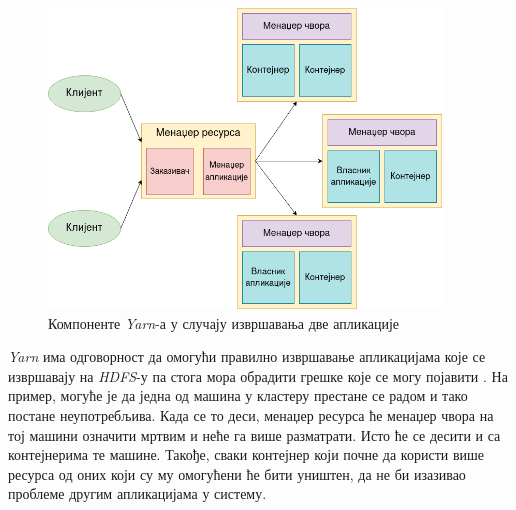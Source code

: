 \documentclass[12pt,oneside]{memoir}
\begin{document}
\begin{figure}[!ht]
  \centering
  \includegraphics[width=0.93\textwidth]{pictures/yarn_arch.png}
  \caption{Компоненте \textit{Yarn}-а у случају извршавања две апликације}
  \label{fig:yarn_ar}
\end{figure}


\textit{Yarn} има одговорност да омогући правилно извршавање апликацијама које се извршавају на \textit{HDFS}-у па стога мора обрадити грешке које се могу појавити \cite{hadoop_learning}. На пример, могуће је да једна од машина у кластеру престане се радом и тако постане неупотребљива. Када се то деси, менаџер ресурса ће менаџер чвора на тој машини означити мртвим и неће га више разматрати. Исто ће се десити и са контејнерима те машине. Такође, сваки контејнер који почне да користи више ресурса од оних који су му омогућени ће бити уништен, да не би изазивао проблеме другим апликацијама у систему.
\end{document}
